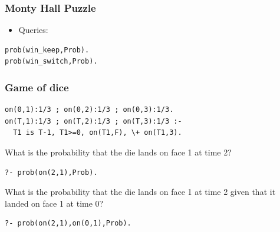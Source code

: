 \documentclass[trans]{beamer}
\begin{document}
\begin{frame}[fragile]
  \frametitle{Monty Hall Puzzle}
\begin{itemize}
\item Queries:
\end{itemize}
\begin{verbatim}
prob(win_keep,Prob).
prob(win_switch,Prob).
\end{verbatim}
\end{frame}


\begin{frame}[fragile]
  \frametitle{Game of dice}
    \begin{verbatim}
on(0,1):1/3 ; on(0,2):1/3 ; on(0,3):1/3.
on(T,1):1/3 ; on(T,2):1/3 ; on(T,3):1/3 :-
  T1 is T-1, T1>=0, on(T1,F), \+ on(T1,3).
\end{verbatim}

  
What is the probability that the die lands on face 1 at time 2?
  \begin{verbatim}
?- prob(on(2,1),Prob).
\end{verbatim}
What is the probability that the die lands on face 1 at time 2 given that it landed on face 1 at time 0?
  \begin{verbatim}
?- prob(on(2,1),on(0,1),Prob).
\end{verbatim}
\end{frame}
\end{document}

